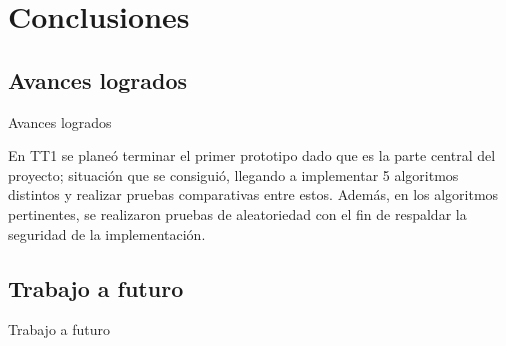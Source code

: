 %
%

\section{Conclusiones}

\subsection{Avances logrados} %
\begin{frame}{Avances logrados}

  En TT1 se planeó terminar el primer prototipo dado que es la parte
  central del proyecto; situación que se consiguió, llegando a implementar
  5 algoritmos distintos y realizar pruebas comparativas entre estos.
  Además, en los algoritmos pertinentes, se realizaron pruebas de
  aleatoriedad con el fin de respaldar la seguridad de la implementación.

\end{frame}

\subsection{Trabajo a futuro} %
\begin{frame}{Trabajo a futuro}


\end{frame}
